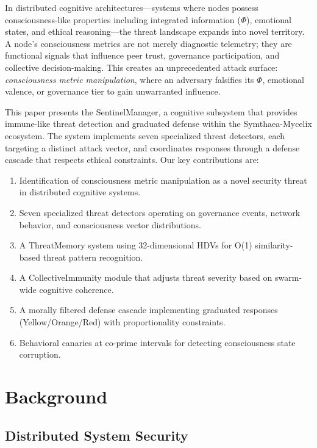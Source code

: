 \documentclass[11pt,a4paper]{article}
\begin{document}
In distributed cognitive architectures---systems where nodes possess consciousness-like properties including integrated information ($\Phi$), emotional states, and ethical reasoning---the threat landscape expands into novel territory. A node's consciousness metrics are not merely diagnostic telemetry; they are functional signals that influence peer trust, governance participation, and collective decision-making. This creates an unprecedented attack surface: \emph{consciousness metric manipulation}, where an adversary falsifies its $\Phi$, emotional valence, or governance tier to gain unwarranted influence.

This paper presents the SentinelManager, a cognitive subsystem that provides immune-like threat detection and graduated defense within the Symthaea-Mycelix ecosystem. The system implements seven specialized threat detectors, each targeting a distinct attack vector, and coordinates responses through a defense cascade that respects ethical constraints. Our key contributions are:

\begin{enumerate}
  \item Identification of consciousness metric manipulation as a novel security threat in distributed cognitive systems.
  \item Seven specialized threat detectors operating on governance events, network behavior, and consciousness vector distributions.
  \item A ThreatMemory system using 32-dimensional HDVs for O(1) similarity-based threat pattern recognition.
  \item A CollectiveImmunity module that adjusts threat severity based on swarm-wide cognitive coherence.
  \item A morally filtered defense cascade implementing graduated responses (Yellow/Orange/Red) with proportionality constraints.
  \item Behavioral canaries at co-prime intervals for detecting consciousness state corruption.
\end{enumerate}

\section{Background}

\subsection{Distributed System Security}
\end{document}
